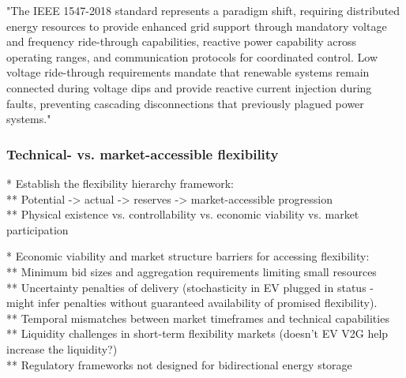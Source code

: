 "The IEEE 1547-2018 standard represents a paradigm shift, requiring distributed energy resources to provide enhanced grid support through mandatory voltage and frequency ride-through capabilities, reactive power capability across operating ranges, and communication protocols for coordinated control. Low voltage ride-through requirements mandate that renewable systems remain connected during voltage dips and provide reactive current injection during faults, preventing cascading disconnections that previously plagued power systems."





\subsubsection{Technical- vs. market-accessible flexibility}


* Establish the flexibility hierarchy framework: \\
** Potential -> actual -> reserves -> market-accessible progression \\
** Physical existence vs. controllability vs. economic viability vs. market participation

* Economic viability and market structure barriers for accessing flexibility: \\
** Minimum bid sizes and aggregation requirements limiting small resources \\
** Uncertainty penalties of delivery (stochasticity in EV plugged in status - might infer penalties without guaranteed availability of promised flexibility). \\
** Temporal mismatches between market timeframes and technical capabilities \\
** Liquidity challenges in short-term flexibility markets (doesn't EV V2G help increase the liquidity?) \\
** Regulatory frameworks not designed for bidirectional energy storage

